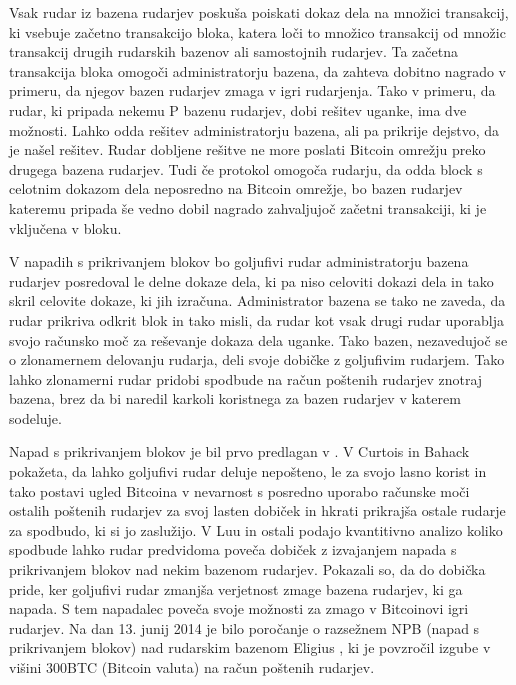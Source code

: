 \documentclass[12pt]{article}
\begin{document}
Vsak rudar iz bazena rudarjev poskuša poiskati dokaz dela na množici transakcij, ki vsebuje začetno transakcijo bloka, katera loči to množico transakcij od množic transakcij drugih rudarskih bazenov ali samostojnih rudarjev. Ta začetna transakcija bloka omogoči administratorju bazena, da zahteva dobitno nagrado v primeru, da njegov bazen rudarjev zmaga v igri rudarjenja. Tako v primeru, da rudar, ki pripada nekemu P bazenu rudarjev, dobi rešitev uganke, ima dve možnosti. Lahko odda rešitev administratorju bazena, ali pa prikrije dejstvo, da je našel rešitev. Rudar dobljene rešitve ne more poslati Bitcoin omrežju preko drugega bazena rudarjev.  Tudi če protokol omogoča rudarju, da odda block s celotnim dokazom dela neposredno na Bitcoin omrežje, bo bazen rudarjev kateremu pripada še vedno dobil nagrado zahvaljujoč začetni transakciji, ki je vključena v bloku.

V napadih s prikrivanjem blokov bo goljufivi rudar administratorju bazena rudarjev posredoval le delne dokaze dela, ki pa niso celoviti dokazi dela in tako skril celovite dokaze, ki jih izračuna. Administrator bazena se tako ne zaveda, da rudar prikriva odkrit blok in tako misli, da rudar kot vsak drugi rudar uporablja svojo računsko moč za reševanje dokaza dela uganke. Tako bazen, nezavedujoč se o zlonamernem delovanju rudarja, deli svoje dobičke z goljufivim rudarjem. Tako lahko zlonamerni rudar pridobi spodbude na račun poštenih rudarjev znotraj bazena, brez da bi naredil karkoli koristnega za bazen rudarjev v katerem sodeluje.

Napad s prikrivanjem blokov je bil prvo predlagan v \cite{analysisofbitcoin}. V \cite{subversivestrategies} Curtois in Bahack pokažeta, da lahko goljufivi rudar deluje nepošteno, le za svojo lasno korist in tako postavi ugled Bitcoina v nevarnost s posredno uporabo računske moči ostalih poštenih rudarjev za svoj lasten dobiček in hkrati prikrajša ostale rudarje za spodbudo, ki si jo zaslužijo. V \cite{powersplitting} Luu in ostali podajo kvantitivno analizo koliko spodbude lahko rudar predvidoma poveča dobiček z izvajanjem napada s prikrivanjem blokov nad nekim bazenom rudarjev. Pokazali so, da do dobička pride, ker goljufivi rudar zmanjša verjetnost zmage bazena rudarjev, ki ga napada. S tem napadalec poveča svoje možnosti za zmago v Bitcoinovi igri rudarjev. Na dan 13. junij 2014 je bilo poročanje o razsežnem NPB (napad s prikrivanjem blokov) nad rudarskim bazenom Eligius \cite{subversivestrategies}, ki je povzročil izgube v višini 300BTC (Bitcoin valuta) na račun poštenih rudarjev.
\end{document}
